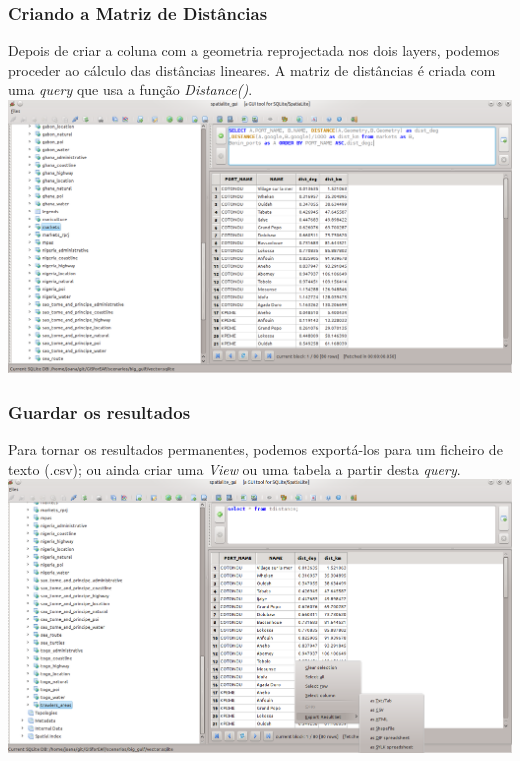 \documentclass[hyperref={pdfpagelabels=true}]{beamer}
\begin{document}
\begin{frame}
\frametitle{Criando a Matriz de Dist\^{a}ncias}
Depois de criar a coluna com a geometria reprojectada nos dois layers, podemos proceder ao c\'{a}lculo das dist\^{a}ncias lineares.
A matriz de dist\^{a}ncias \'{e} criada com uma \textit{query} que usa a fun\c{c}\~{a}o \textit{Distance()}.\\
\includegraphics[scale=0.25]{distance8.png}
\end{frame}

\begin{frame}
\frametitle{Guardar os resultados}
Para tornar os resultados permanentes, podemos export\'{a}-los para um ficheiro de texto (.csv); ou ainda criar uma \textit{View} ou uma tabela a partir desta \textit{query}.\\
\includegraphics[scale=0.25]{distance11.png}
\end{frame}
\end{document}
